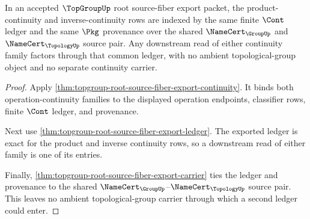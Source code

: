 \begin{theorem}
\label{thm:topgroup-root-source-fiber-export-common-cont-ledger}
In an accepted $\TopGroupUp$ root source-fiber export packet, the
product-continuity and inverse-continuity rows are indexed by the same finite
$\Cont$ ledger and the same $\Pkg$ provenance over the shared
$\NameCert_{\GroupUp}$ and $\NameCert_{\TopologyUp}$ source pair. Any
downstream read of either continuity family factors through that common ledger,
with no ambient topological-group object and no separate continuity carrier.
\end{theorem}
\begin{proof}
Apply \autoref{thm:topgroup-root-source-fiber-export-continuity}. It binds
both operation-continuity families to the displayed operation endpoints,
classifier rows, finite $\Cont$ ledger, and provenance.

Next use \autoref{thm:topgroup-root-source-fiber-export-ledger}. The exported
ledger is exact for the product and inverse continuity rows, so a downstream
read of either family is one of its entries.

Finally, \autoref{thm:topgroup-root-source-fiber-export-carrier} ties the
ledger and provenance to the shared
$\NameCert_{\GroupUp}$--$\NameCert_{\TopologyUp}$ source pair. This leaves no
ambient topological-group carrier through which a second ledger could enter.
\end{proof}

